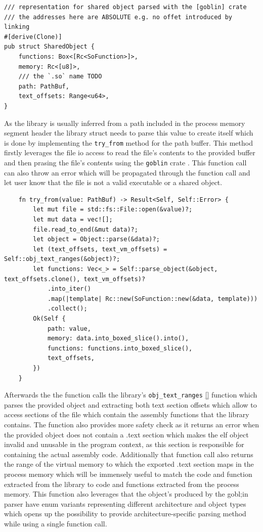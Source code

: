 \begin{lstlisting}
/// representation for shared object parsed with the [goblin] crate
/// the addresses here are ABSOLUTE e.g. no offet introduced by linking
#[derive(Clone)]
pub struct SharedObject {
    functions: Box<[Rc<SoFunction>]>,
    memory: Rc<[u8]>,
    /// the `.so` name TODO
    path: PathBuf,
    text_offsets: Range<u64>,
}
\end{lstlisting}

As the library is usually inferred from a path included in the process memory segment header the library struct needs to parse this value to create itself which is done by implementing the \verb|try_from| method for the path buffer.
This method firstly leverages the file io access to read the file's contents to the provided buffer and then prasing the file's contents using the \verb|goblin| crate \cite{m4b_m4bgoblin_2024}.
This function call can also throw an error which will be propagated through the function call and let user know that the file is not a valid executable or a shared object.

\begin{lstlisting}
    fn try_from(value: PathBuf) -> Result<Self, Self::Error> {
        let mut file = std::fs::File::open(&value)?;
        let mut data = vec![];
        file.read_to_end(&mut data)?;
        let object = Object::parse(&data)?;
        let (text_offsets, text_vm_offsets) = Self::obj_text_ranges(&object)?;
        let functions: Vec<_> = Self::parse_object(&object, text_offsets.clone(), text_vm_offsets)?
            .into_iter()
            .map(|template| Rc::new(SoFunction::new(&data, template)))
            .collect();
        Ok(Self {
            path: value,
            memory: data.into_boxed_slice().into(),
            functions: functions.into_boxed_slice(),
            text_offsets,
        })
    }
\end{lstlisting}

Afterwards the the function calls the library's \verb|obj_text_ranges| \ref{} function which parses the provided object and extracting both text section offsets which allow to access sections of the file which contain the assembly functions that the library contains.
The function also provides more safety check as it returns an error when the provided object does not contain a .text section which makes the elf object invalid and unusable in the program context, as this section is responsible for containing the actual assembly code.
Additionally that function call also returns the range of the virtual memory to which the exported .text section maps in the process memory which will be immensely useful to match the code and function extracted from the library to code and functions extracted from the process memory.
This function also leverages that the object's produced by the gobl;in parser have enum variants representing different architecture and object types which opens up the possibility to provide architecture-specific parsing method while using a single function call.

